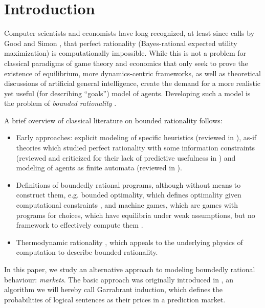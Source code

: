 \section{Introduction}

Computer scientists and economists have long recognized, at least since calls by Good \cite{oldreview_good} and Simon \cite{oldreview_simon}, that perfect rationality (Bayes-rational expected utility maximization) is computationally impossible. While this is not a problem for classical paradigms of game theory and economics that only seek to prove the existence of equilibrium, more dynamics-centric frameworks, as well as theoretical discussions of artificial general intelligence, create the demand for a more realistic yet useful (for describing ``goals'') model of agents. Developing such a model is the problem of \emph{bounded rationality} \cite{oldreview_gigerenzer}.

A brief overview of classical literature on bounded rationality follows:

\begin{itemize}
    \item Early approaches: explicit modeling of specific heuristics (reviewed in \cite{oldreview_heuristics}), as-if theories which studied perfect rationality with some information constraints (reviewed and criticized for their lack of predictive usefulness in \cite{oldreview_arrow, norationalization_friedman}) and modeling of agents as finite automata (reviewed in \cite{oldreview_aumann}). 
    \item Definitions of boundedly rational programs, although without means to construct them, e.g. bounded optimality, which defines optimality given computational constraints \cite{bounded_optimality_LHS, bounded_optimality_RS, bounded_optimality_zilberstein}, and machine games, which are games with programs for choices, which have equilibria under weak assumptions, but no framework to effectively compute them \cite{halpern_game, halpern_choice, tennenholtz}.
    \item Thermodynamic rationality \cite{thermo_info, thermo_thermo, thermo_main}, which appeals to the underlying physics of computation to describe bounded rationality.
\end{itemize}

In this paper, we study an alternative approach to modeling boundedly rational behaviour: \emph{markets}. The basic approach was originally introduced in \cite{logical_induction}, an algorithm we will hereby call Garrabrant induction, which defines the probabilities of logical sentences as their prices in a prediction market. 

